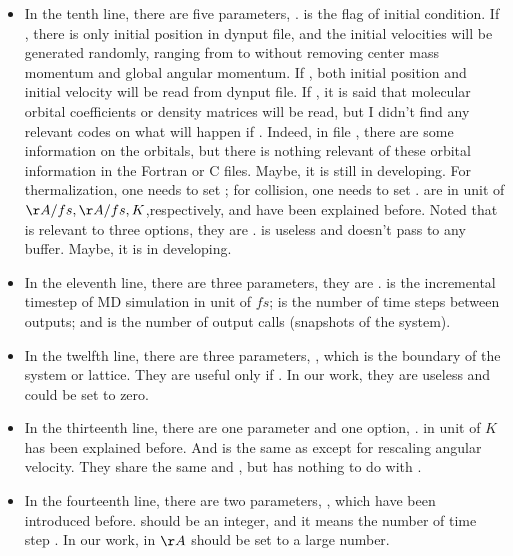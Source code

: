 \documentclass[11pt]{JHEP3}
\begin{document}
\begin{itemize}
\item In the tenth line, there are five parameters,
.  is the flag of
initial condition. If , there is only initial position
in dynput file, and the initial velocities will be generated
randomly, ranging from  to  without
removing center mass momentum and global angular momentum. If
, both initial position and initial velocity will be
read from dynput file. If , it is said that molecular
orbital coefficients or density matrices will be read, but I didn't
find any relevant codes on what will happen if .
Indeed, in file , there are some information on the
orbitals, but there is nothing relevant of these orbital information
in the Fortran or C files. Maybe, it is still in developing. For
thermalization, one needs to set ; for collision, one
needs to set .  are in unit
of $\AA/fs,\AA/fs,K$,respectively, and have been explained before.
Noted that  is relevant to three options, they are
.  is useless and doesn't
pass to any buffer. Maybe, it is in developing.

\item In the eleventh line, there are three parameters, they are
.  is the incremental timestep of MD
simulation in unit of $fs$;  is the number of time
steps between outputs; and  is the number of output
calls (snapshots of the system).

\item In the twelfth line, there are three parameters,
, which is the boundary of the system or lattice.
They are useful only if . In our work, they are
useless and could be set to zero.

\item In the thirteenth line, there are one parameter and one
option, .  in unit of $K$ has been
explained before. And  is the same as 
except for rescaling angular velocity. They share the same
 and , but  has nothing to
do with .

\item In the fourteenth line, there are two parameters, , which have been introduced before.  should be an
integer, and it means the number of time step . In our
work,  in $\AA$ should be set to a large number.


\end{itemize}
\end{document}
